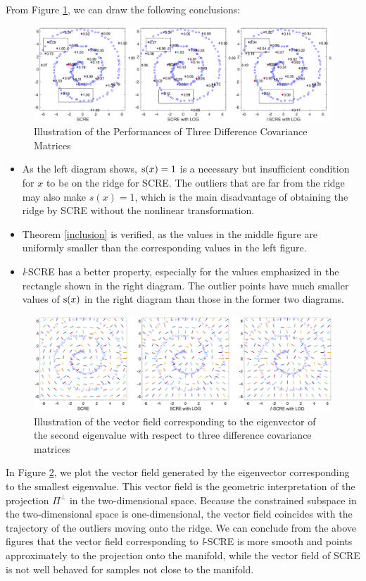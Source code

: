 \documentclass[aos,preprint]{imsart}
\theoremstyle{remark}
\begin{document}
 From Figure \ref{fig:Diff Covariance}, we can draw the following conclusions:
  \begin{figure}[h] %
    \includegraphics[width=\linewidth]{compare5n.eps} 
    \caption{Illustration of the Performances of Three Difference Covariance Matrices }
    \label{fig:Diff Covariance}
 \end{figure}
 \begin{itemize}
 \item As the left diagram shows, ${\rm s}(x)=1$ is a necessary but insufficient condition for $x$ to be on the ridge for SCRE. The outliers that are far from the ridge may also make $s(x)=1$, which is the main disadvantage of obtaining the ridge by SCRE without the nonlinear transformation.
 \item Theorem \ref{inclusion} is verified, as the values in the middle figure are uniformly smaller than the corresponding values in the left figure.
\item {\it l}-SCRE has a better property, especially for the values emphasized in the rectangle shown in the right diagram. The outlier points have much smaller values of ${\rm s}(x)$ in the right diagram than those in the former two diagrams.
 \end{itemize}
 
   \begin{figure}[h] %
    \includegraphics[width=\linewidth]{vectorfield2.eps} 
    \caption{Illustration of the vector field corresponding to the eigenvector of the second eigenvalue with respect to three difference covariance matrices }
    \label{fig:vectorfield}
 \end{figure}
In Figure \ref{fig:vectorfield}, we plot the vector field generated by the eigenvector corresponding to the smallest eigenvalue. This vector field is the geometric interpretation of the projection $\Pi^{\perp}$ in the two-dimensional space. Because the constrained subspace in the two-dimensional space is one-dimensional, the vector field coincides with the trajectory of the outliers moving onto the ridge. We can conclude from the above figures that the vector field corresponding to {\it l}-SCRE is more smooth and points approximately to the projection onto the manifold, while the vector field of SCRE is not well behaved for samples not close to the manifold.
\end{document}
